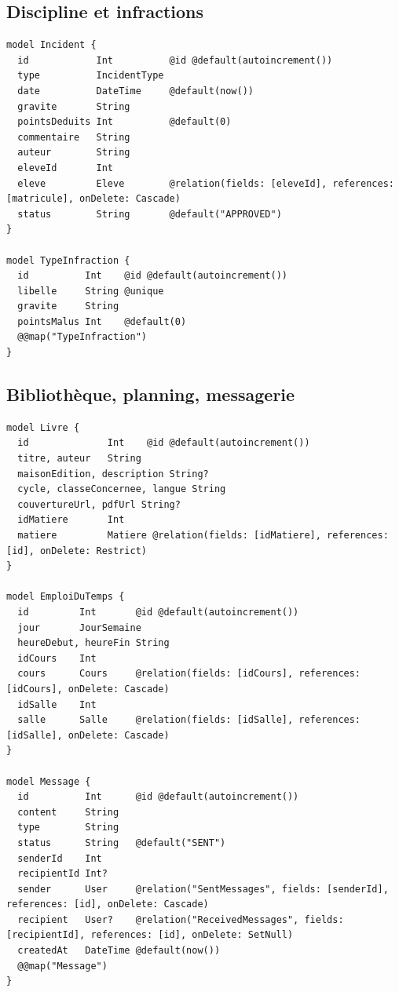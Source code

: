 \documentclass[12pt,a4paper]{article}
\begin{document}
\subsection{Discipline et infractions}

\begin{lstlisting}[style=code]
model Incident {
  id            Int          @id @default(autoincrement())
  type          IncidentType
  date          DateTime     @default(now())
  gravite       String
  pointsDeduits Int          @default(0)
  commentaire   String
  auteur        String
  eleveId       Int
  eleve         Eleve        @relation(fields: [eleveId], references: [matricule], onDelete: Cascade)
  status        String       @default("APPROVED")
}

model TypeInfraction {
  id          Int    @id @default(autoincrement())
  libelle     String @unique
  gravite     String
  pointsMalus Int    @default(0)
  @@map("TypeInfraction")
}
\end{lstlisting}

\subsection{Bibliothèque, planning, messagerie}

\begin{lstlisting}[style=code]
model Livre {
  id              Int    @id @default(autoincrement())
  titre, auteur   String
  maisonEdition, description String?
  cycle, classeConcernee, langue String
  couvertureUrl, pdfUrl String?
  idMatiere       Int
  matiere         Matiere @relation(fields: [idMatiere], references: [id], onDelete: Restrict)
}

model EmploiDuTemps {
  id         Int       @id @default(autoincrement())
  jour       JourSemaine
  heureDebut, heureFin String
  idCours    Int
  cours      Cours     @relation(fields: [idCours], references: [idCours], onDelete: Cascade)
  idSalle    Int
  salle      Salle     @relation(fields: [idSalle], references: [idSalle], onDelete: Cascade)
}

model Message {
  id          Int      @id @default(autoincrement())
  content     String
  type        String
  status      String   @default("SENT")
  senderId    Int
  recipientId Int?
  sender      User     @relation("SentMessages", fields: [senderId], references: [id], onDelete: Cascade)
  recipient   User?    @relation("ReceivedMessages", fields: [recipientId], references: [id], onDelete: SetNull)
  createdAt   DateTime @default(now())
  @@map("Message")
}
\end{lstlisting}
\end{document}
